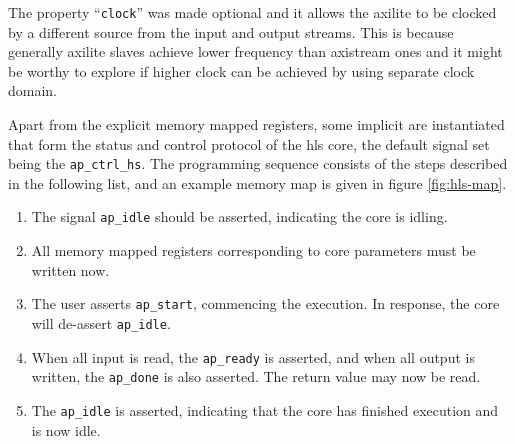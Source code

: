 The property ``\texttt{clock}'' was made optional and it allows the \gls{axilite}
to be clocked by a different source from the input and output streams. 
This is because generally \gls{axilite} slaves achieve lower frequency than \gls{axistream} ones
and it might be worthy to explore if higher clock can be achieved by using separate clock domain.

Apart from the explicit memory mapped registers, some implicit are instantiated 
that form the status and control protocol of the \gls{hls} core, the default signal
set being the \texttt{ap\_ctrl\_hs}. The programming sequence consists of the steps
described in the following list, and an example memory map is given in figure \ref{fig:hls-map}.

\begin{enumerate}
\item	The signal \texttt{ap\_idle} should be asserted, indicating the core is idling.
\item	All memory mapped registers corresponding to core parameters must be written now.
\item	The user asserts \texttt{ap\_start}, commencing the execution. In response,
	the core will de-assert \texttt{ap\_idle}.
\item	When all input is read, the \texttt{ap\_ready} is asserted, and when all
	output is written, the \texttt{ap\_done} is also asserted.
	The return value may now be read.
\item	The \texttt{ap\_idle} is asserted, indicating that the core has
	finished execution and is now idle.
\end{enumerate}

